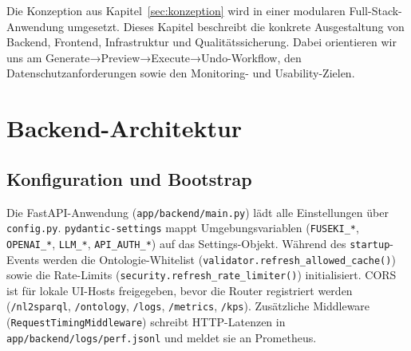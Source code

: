Die Konzeption aus Kapitel~\ref{sec:konzeption} wird in einer modularen Full-Stack-Anwendung umgesetzt. Dieses Kapitel beschreibt die konkrete Ausgestaltung von Backend, Frontend, Infrastruktur und Qualitätssicherung. Dabei orientieren wir uns am Generate→Preview→Execute→Undo-Workflow, den Datenschutzanforderungen sowie den Monitoring- und Usability-Zielen.

\section{Backend-Architektur}

\subsection{Konfiguration und Bootstrap}
Die FastAPI-Anwendung (\texttt{app/backend/main.py}) lädt alle Einstellungen über \texttt{config.py}. \texttt{pydantic-settings} mappt Umgebungsvariablen (\texttt{FUSEKI\_*}, \texttt{OPENAI\_*}, \texttt{LLM\_*}, \texttt{API\_AUTH\_*}) auf das Settings-Objekt. Während des \texttt{startup}-Events werden die Ontologie-Whitelist (\texttt{validator.refresh\_allowed\_cache()}) sowie die Rate-Limits (\texttt{security.refresh\_rate\_limiter()}) initialisiert. CORS ist für lokale UI-Hosts freigegeben, bevor die Router registriert werden (\texttt{/nl2sparql}, \texttt{/ontology}, \texttt{/logs}, \texttt{/metrics}, \texttt{/kps}). Zusätzliche Middleware (\texttt{RequestTimingMiddleware}) schreibt HTTP-Latenzen in \texttt{app/backend/logs/perf.jsonl} und meldet sie an Prometheus.


